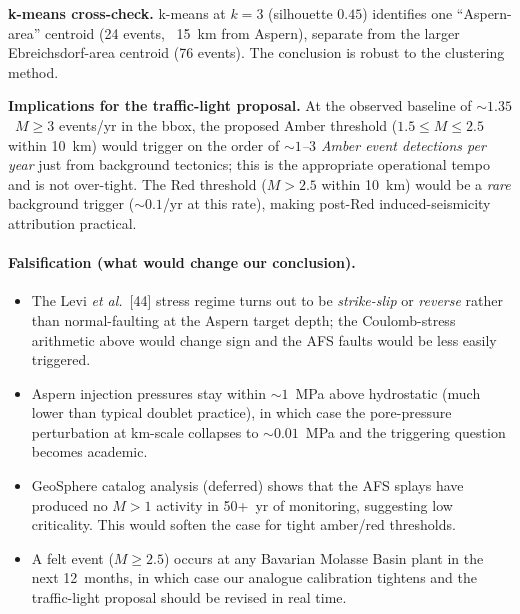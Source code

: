 \documentclass{article}
\begin{document}
\textbf{k-means cross-check.} k-means at $k=3$ (silhouette $0.45$)
identifies one ``Aspern-area'' centroid (24 events, ~15~km from
Aspern), separate from the larger Ebreichsdorf-area centroid (76
events). The conclusion is robust to the clustering method.

\textbf{Implications for the traffic-light proposal.} At the
observed baseline of $\sim 1.35$~$M\geq 3$ events/yr in the
bbox, the proposed Amber threshold ($1.5 \leq M \leq 2.5$ within
10~km) would trigger on the order of \emph{$\sim 1$--$3$ Amber
event detections per year} just from background tectonics; this
is the appropriate operational tempo and is not over-tight.
The Red threshold ($M > 2.5$ within 10~km) would be a
\emph{rare} background trigger ($\sim 0.1$/yr at this rate),
making post-Red induced-seismicity attribution practical.

\paragraph{Falsification (what would change our conclusion).}
\begin{itemize}
\item The Levi \emph{et al.}\ [44] stress regime turns out to be
\emph{strike-slip} or \emph{reverse} rather than normal-faulting
at the Aspern target depth; the Coulomb-stress arithmetic above
would change sign and the AFS faults would be less easily
triggered.
\item Aspern injection pressures stay within $\sim 1$~MPa above
hydrostatic (much lower than typical doublet practice), in which
case the pore-pressure perturbation at km-scale collapses to
$\sim 0.01$~MPa and the triggering question becomes academic.
\item GeoSphere catalog analysis (deferred) shows that the AFS
splays have produced no $M > 1$ activity in 50+~yr of monitoring,
suggesting low criticality. This would soften the case for tight
amber/red thresholds.
\item A felt event ($M \geq 2.5$) occurs at any Bavarian Molasse
Basin plant in the next 12~months, in which case our analogue
calibration tightens and the traffic-light proposal should be
revised in real time.
\end{itemize}
\end{document}
